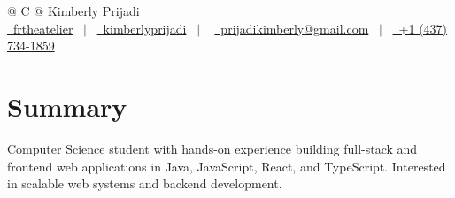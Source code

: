 \documentclass[a4paper,10pt]{article} %
\makeatletter
\newenvironment{jobshort}[2]
    {
    \begin{tabularx}{\linewidth}{@{}l X r@{}}
    \textbf{#1} & \hfill &  #2 \\[3.75pt]
    \end{tabularx}
    }
    {
    }
\makeatother
\begin{document}
\pagestyle{empty} 



\begin{tabularx}{\linewidth}{@{} C @{}}
\huge{Kimberly Prijadi} \\[7.5pt]
\href{https://github.com/frtheatelier}{\raisebox{-0.05\height}\faGithub\ frtheatelier} \ $|$ \ 
\href{https://linkedin.com/in/kimberlyprijadi}{\raisebox{-0.05\height}\faLinkedin\ kimberlyprijadi} \ $|$ \ 
\href{mailto:prijadikimberly@gmail.com}{\raisebox{-0.05\height}\faEnvelope \ prijadikimberly@gmail.com} \ $|$ \ 
\href{tel:+14377341859}{\raisebox{-0.05\height}\faMobile \ +1 (437) 734-1859} \\
\end{tabularx}


\section{Summary}
Computer Science student with hands-on experience building full-stack and frontend web applications in Java, JavaScript, React, and TypeScript. Interested in scalable web systems and backend development.


\end{document}
